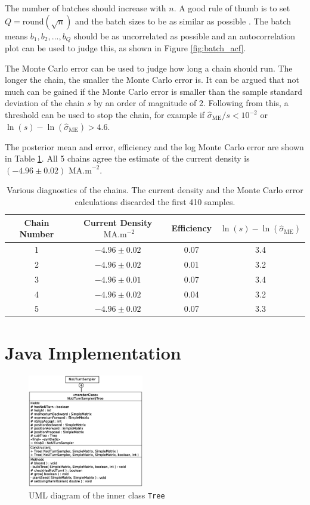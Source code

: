 \documentclass[10pt]{proc}
\newcommand{\dotdotdot}{...}
\begin{document}
The number of batches should increase with $n$. A good rule of thumb is to set $Q=\text{round}(\sqrt{n})$ and the batch sizes to be as similar as possible \citep{jones2006fixed}. The batch means $b_1,b_2,\dotdotdot,b_Q$ should be as uncorrelated as possible and an autocorrelation plot can be used to judge this, as shown in Figure \ref{fig:batch_acf}. 

The Monte Carlo error can be used to judge how long a chain should run. The longer the chain, the smaller the Monte Carlo error is. It can be argued that not much can be gained if the Monte Carlo error is smaller than the sample standard deviation of the chain $s$ by an order of magnitude of 2. Following from this, a threshold can be used to stop the chain, for example if $\widehat{\sigma}_{\text{ME}}/s<10^{-2}$ or $\ln(s)-\ln(\widehat{\sigma}_{\text{ME}}) > 4.6$.

The posterior mean and error, efficiency and the log Monte Carlo error are shown in Table \ref{table:diagnostic}. All 5 chains agree the estimate of the current density is $(-4.96 \pm 0.02) \text{ MA.m}^{-2}$.

\begin{table}[htp]
\centering
\begin{tabular}{c|c|c|c}
Chain Number & Current Density $\text{ MA.m}^{-2}$ & Efficiency & $\ln(s)-\ln(\widehat{\sigma}_{\text{ME}})$ \\
\hline
1 & $-4.96 \pm 0.02$ & 0.07 & 3.4\\
2 & $-4.96 \pm 0.02$ & 0.01 & 3.2\\
3 & $-4.96 \pm 0.01$ & 0.07 & 3.4\\
4 & $-4.96 \pm 0.02$ & 0.04 & 3.2\\
5 & $-4.96 \pm 0.02$ & 0.07 & 3.3\\
\end{tabular}
\caption{Various diagnostics of the chains. The current density and the Monte Carlo error calculations discarded the first 410 samples.}
\label{table:diagnostic}
\end{table}

\section{Java Implementation}

\begin{figure}[ht]
  \centering
  \includegraphics[width=0.45\textwidth]{NoUTurnSampler.eps}
  \caption{UML diagram of the inner class \texttt{Tree}}
  \label{fig:tree_uml}
\end{figure}
\end{document}
